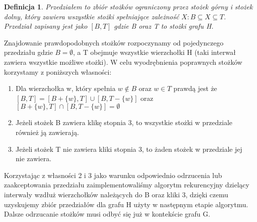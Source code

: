 \documentclass[11pt]{article}
\newtheorem{definition}{Definicja}[section]
\begin{document}
\begin{definition}
Przedziałem to zbiór stożków ograniczony przez stożek górny i stożek dolny, który zawiera wszystkie stożki spełniające zależność  $X: B \subseteq X \subseteq T$. Przedział zapisany jest jako $[B, T]$ gdzie B oraz T to stożki grafu H. 
\end{definition}


Znajdowanie prawdopodobnych stożków rozpoczynamy od pojedynczego przedziału gdzie $B = \emptyset$, a T obejmuje wszystkie wierzchołki H (taki interwał zawiera wszystkie możliwe stożki). W celu wyodrębnienia poprawnych stożków korzystamy z poniższych własności:
\begin{enumerate}
\item Dla wierzchołka w, który spełnia $w \notin B$ oraz $w\in T$ prawdą jest że $[B, T] = [B + \{ w\}, T] \cup [B , T - \{ w\}]$ oraz $[B +\{ w\}, T] \cap [B , T - \{ w\}] = \emptyset$

\item Jeżeli stożek B zawiera klikę stopnia 3, to wszystkie stożki w przedziale również ją zawierają. 

\item Jeżeli stożek T nie zawiera kliki stopnia 3, to żaden stożek w przedziale jej nie zawiera.
\end{enumerate}

Korzystając z własności 2 i 3 jako warunku odpowiednio odrzucenia lub zaakceptowania przedziału zaimplementowaliśmy algorytm rekurencyjny dzielący interwały wzdłuż wierzchołków należących do B oraz kliki 3, dzięki czemu uzyskujemy zbiór przedziałów dla grafu H użyty w następnym etapie algorytmu.
Dalsze odrzucanie stożków musi odbyć się już w kontekście grafu G.
  
\end{document}
